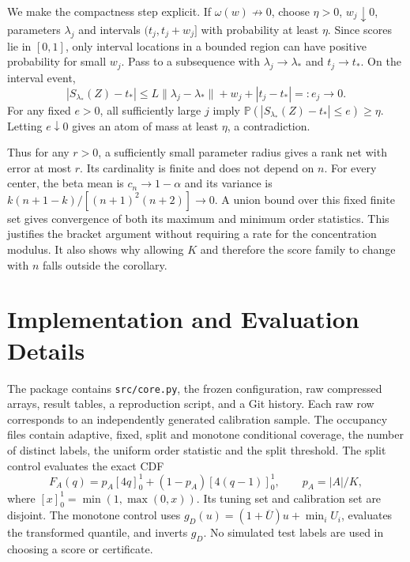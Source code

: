 \documentclass{article}
\newcommand{\PP}{\mathbb P}
\begin{document}
We make the compactness step explicit. If $\omega(w)\not\to0$, choose $\eta>0$, $w_j\downarrow0$, parameters $\lambda_j$ and intervals $(t_j,t_j+w_j]$ with probability at least $\eta$. Since scores lie in $[0,1]$, only interval locations in a bounded region can have positive probability for small $w_j$. Pass to a subsequence with $\lambda_j\to\lambda_*$ and $t_j\to t_*$. On the interval event,
\begin{equation}
 |S_{\lambda_*}(Z)-t_*|\le L\|\lambda_j-\lambda_*\|+w_j+|t_j-t_*|=:e_j\to0.
\end{equation}
For any fixed $e>0$, all sufficiently large $j$ imply $\PP(|S_{\lambda_*}(Z)-t_*|\le e)\ge\eta$. Letting $e\downarrow0$ gives an atom of mass at least $\eta$, a contradiction.

Thus for any $r>0$, a sufficiently small parameter radius gives a rank net with error at most $r$. Its cardinality is finite and does not depend on $n$. For every center, the beta mean is $c_n\to1-\alpha$ and its variance is $k(n+1-k)/[(n+1)^2(n+2)]\to0$. A union bound over this fixed finite set gives convergence of both its maximum and minimum order statistics. This justifies the bracket argument without requiring a rate for the concentration modulus. It also shows why allowing $K$ and therefore the score family to change with $n$ falls outside the corollary.

\section{Implementation and Evaluation Details}\label{app:implementation}

The package contains \texttt{src/core.py}, the frozen configuration, raw compressed arrays, result tables, a reproduction script, and a Git history. Each raw row corresponds to an independently generated calibration sample. The occupancy files contain adaptive, fixed, split and monotone conditional coverage, the number of distinct labels, the uniform order statistic and the split threshold. The split control evaluates the exact CDF
\begin{equation}
 F_A(q)=p_A[4q]_0^1+(1-p_A)[4(q-1)]_0^1,\qquad p_A=|A|/K,
\end{equation}
where $[x]_0^1=\min(1,\max(0,x))$. Its tuning set and calibration set are disjoint. The monotone control uses $g_D(u)=(1+\overline U)u+\min_iU_i$, evaluates the transformed quantile, and inverts $g_D$. No simulated test labels are used in choosing a score or certificate.
\end{document}
